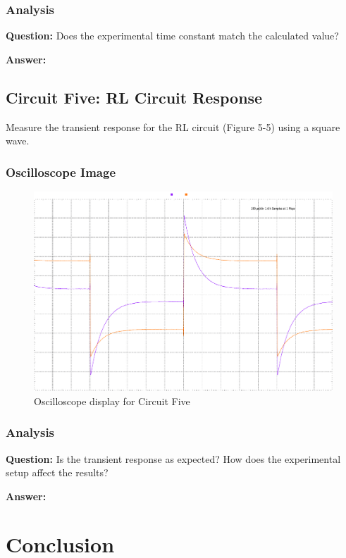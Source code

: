 \documentclass[12pt]{article}
\begin{document}
\subsubsection{Analysis}
\textbf{Question:} Does the experimental time constant match the calculated value?

\textbf{Answer:} \\

\subsection{Circuit Five: RL Circuit Response}
Measure the transient response for the RL circuit (Figure 5-5) using a square wave.

\subsubsection{Oscilloscope Image}
\begin{figure}[H]
	\centering
	\includegraphics[width=16cm]{05_scopy4}
	\caption{Oscilloscope display for Circuit Five}
\end{figure}

\subsubsection{Analysis}
\textbf{Question:} Is the transient response as expected? How does the experimental setup affect the results?

\textbf{Answer:} \\

\section{Conclusion}
\end{document}
